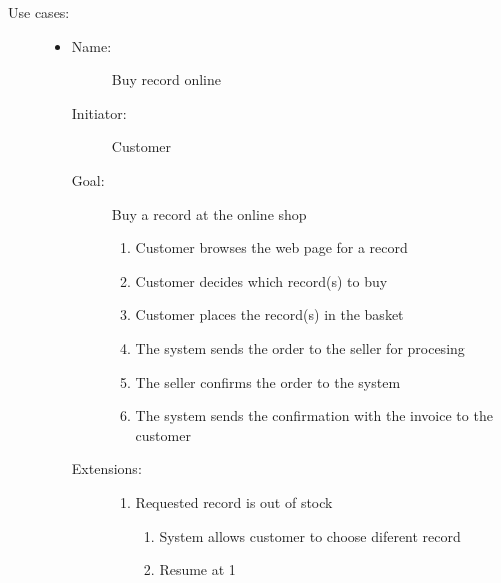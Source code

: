 \documentclass[12pt, titlepage]{article}
\begin{document}
\begin{description}
    \item[Use cases:] \hfil
    \begin{itemize}
    \item
        \begin{description}
            \item[Name:]Buy record online 
            \item[Initiator:]Customer
            \item[Goal:]Buy a record at the online shop 
            \begin{enumerate}
                \item Customer browses the web page for a record
                \item Customer decides which record(s) to buy
                \item Customer places the record(s) in the basket
                \item The system sends the order to the seller for procesing
                \item The seller confirms the order to the system
                \item The system sends the confirmation with the invoice to the customer
            \end{enumerate}
            \item[Extensions:] \hfil
            \begin{enumerate}
                \item Requested record is out of stock
                \begin{enumerate}
                    \item System allows customer to choose diferent record
                    \item Resume at 1
                \end{enumerate}
            \end{enumerate}
        \end{description}


\end{itemize}
\end{description}
\end{document}
